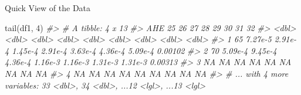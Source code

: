 \documentclass[
  11pt,
  ignorenonframetext,
  svgnames, handout, t]{beamer}
\newenvironment{Shaded}{\begin{snugshade}}{\end{snugshade}}
\newcommand{\CommentTok}[1]{\textcolor[rgb]{0.56,0.35,0.01}{\textit{#1}}}
\newcommand{\DecValTok}[1]{\textcolor[rgb]{0.00,0.00,0.81}{#1}}
\newcommand{\FunctionTok}[1]{\textcolor[rgb]{0.00,0.00,0.00}{#1}}
\newcommand{\NormalTok}[1]{#1}
\begin{document}
\begin{frame}[fragile]{Quick View of the Data}
\begin{Shaded}
\begin{Highlighting}[]
\FunctionTok{tail}\NormalTok{(df1, }\DecValTok{4}\NormalTok{)}
\CommentTok{\#\textgreater{} \# A tibble: 4 x 13}
\CommentTok{\#\textgreater{}     AHE      \textasciigrave{}25\textasciigrave{}     \textasciigrave{}26\textasciigrave{}     \textasciigrave{}27\textasciigrave{}     \textasciigrave{}28\textasciigrave{}     \textasciigrave{}29\textasciigrave{}     \textasciigrave{}30\textasciigrave{}     \textasciigrave{}31\textasciigrave{}     \textasciigrave{}32\textasciigrave{}}
\CommentTok{\#\textgreater{}   \textless{}dbl\textgreater{}     \textless{}dbl\textgreater{}    \textless{}dbl\textgreater{}    \textless{}dbl\textgreater{}    \textless{}dbl\textgreater{}    \textless{}dbl\textgreater{}    \textless{}dbl\textgreater{}    \textless{}dbl\textgreater{}    \textless{}dbl\textgreater{}}
\CommentTok{\#\textgreater{} 1    65   7.27e{-}5  2.91e{-}4  1.45e{-}4  2.91e{-}4  3.63e{-}4  4.36e{-}4  5.09e{-}4  0.00102}
\CommentTok{\#\textgreater{} 2    70   5.09e{-}4  9.45e{-}4  4.36e{-}4  1.16e{-}3  1.16e{-}3  1.31e{-}3  1.31e{-}3  0.00313}
\CommentTok{\#\textgreater{} 3    NA  NA       NA       NA       NA       NA       NA       NA       NA      }
\CommentTok{\#\textgreater{} 4    NA  NA       NA       NA       NA       NA       NA       NA       NA      }
\CommentTok{\#\textgreater{} \# ... with 4 more variables: \textasciigrave{}33\textasciigrave{} \textless{}dbl\textgreater{}, \textasciigrave{}34\textasciigrave{} \textless{}dbl\textgreater{}, ...12 \textless{}lgl\textgreater{}, ...13 \textless{}lgl\textgreater{}}
\end{Highlighting}
\end{Shaded}

\normalsize
\end{frame}
\end{document}
